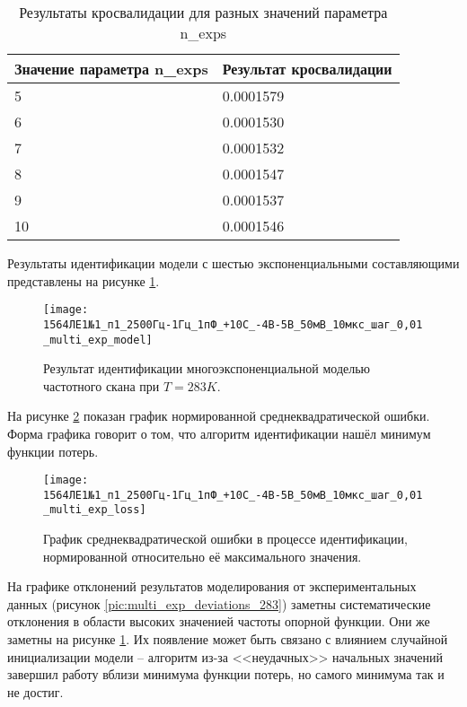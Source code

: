 	\begin{table}[!htp]
		\centering
		\caption{Результаты кросвалидации для разных значений параметра n\_exps}
		\begin{tabular}{|l|l|}
		\hline
		Значение параметра n\_exps & Результат кросвалидации \\ \hline
		5                          & 0.0001579               \\ \hline
		6                          & 0.0001530               \\ \hline
		7                          & 0.0001532               \\ \hline
		8                          & 0.0001547               \\ \hline
		9                          & 0.0001537               \\ \hline
		10                         & 0.0001546               \\ \hline
		\end{tabular}
		\label{table:multi_exp_model_283_cross_val}
	\end{table}

	Результаты идентификации модели с шестью экспоненциальными составляющими
	представлены на рисунке \ref{pic:multi_exp_model_283}.

	\begin{figure}[!htp]
		\centering
		\texttt{[image: 1564ЛЕ1№1\_п1\_2500Гц-1Гц\_1пФ\_+10С\_-4В-5В\_50мВ\_10мкс\_шаг\_0,01\_multi\_exp\_model]}
		\caption{Результат идентификации многоэкспоненциальной моделью 
		         частотного скана при $T=283K$.}
		\label{pic:multi_exp_model_283}
	\end{figure}

	На рисунке \ref{pic:multi_exp_loss_283} показан график нормированной
	среднеквадратической ошибки. Форма графика говорит о том, что алгоритм
	идентификации нашёл минимум функции потерь.

	\begin{figure}[!htp]
		\centering
		\texttt{[image: 1564ЛЕ1№1\_п1\_2500Гц-1Гц\_1пФ\_+10С\_-4В-5В\_50мВ\_10мкс\_шаг\_0,01\_multi\_exp\_loss]}
		\caption{График среднеквадратической ошибки в процессе идентификации,
		         нормированной относительно её максимального значения.}
		\label{pic:multi_exp_loss_283}
	\end{figure}

	На графике отклонений результатов моделирования от экспериментальных данных
	(рисунок \ref{pic:multi_exp_deviations_283}) заметны систематические отклонения
	в области высоких значенией частоты опорной функции. Они же заметны на 
	рисунке \ref{pic:multi_exp_model_283}. Их появление может быть связано с 
	влиянием случайной инициализации модели -- алгоритм из-за <<неудачных>> 
	начальных значений завершил работу вблизи минимума функции потерь, но
	самого минимума так и не достиг.

